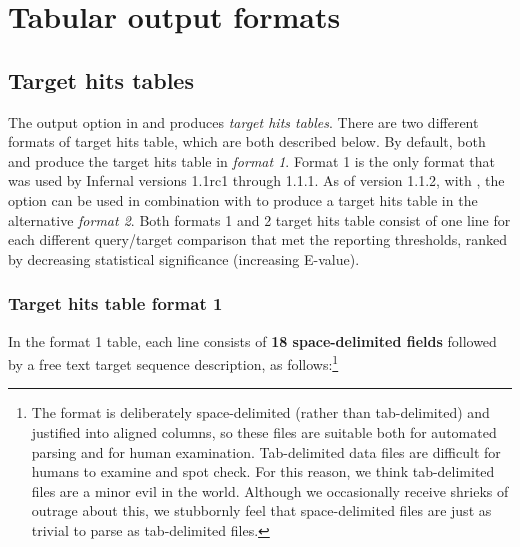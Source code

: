 \section{Tabular output formats}
\label{section:tabular}
\setcounter{footnote}{0}

\subsection{Target hits tables}

The  output option in  and
 produces \emph{target hits tables}. There are two
different formats of target hits table, which are both described
below. By default, both  and  produce the
target hits table in \emph{format 1}. Format 1 is the only format that
was used by Infernal versions 1.1rc1 through 1.1.1. As of version 1.1.2,
with , the  option can be used in
combination with  to produce a target hits table in
the alternative \emph{format 2}.  Both formats 1 and 2 target hits
table consist of one line for each different query/target comparison
that met the reporting thresholds, ranked by decreasing statistical
significance (increasing E-value).

\subsubsection{Target hits table format 1}

In the format 1 table, each line
consists of \textbf{18 space-delimited fields} followed by a free text
target sequence description, as follows:\footnote{The 
  format is deliberately space-delimited (rather than tab-delimited)
  and justified into aligned columns, so these files are suitable both
  for automated parsing and for human examination. Tab-delimited data
  files are difficult for humans to examine and spot check. For this
  reason, we think tab-delimited files are a minor evil in the
  world. Although we occasionally receive shrieks of outrage about
  this, we stubbornly feel that space-delimited files are just as
  trivial to parse as tab-delimited files.}

